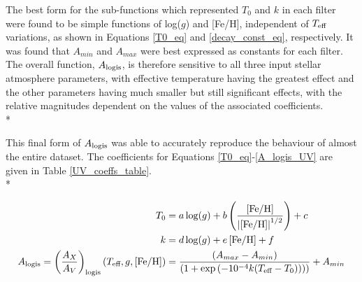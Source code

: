 \documentclass[12pt, a4paper]{report}
\begin{document}
The best form for the sub-functions which represented $T_{0}$ and $k$ in each filter were found to be simple functions of log($g$) and [Fe/H], independent of $T_{\textnormal{eff}}$ variations, as shown in Equations \ref{T0_eq} and \ref{decay_const_eq}, respectively. It was found that $A_{min}$ and $A_{max}$ were best expressed as constants for each filter. The overall function, $A_{\textnormal{logis}}$, is therefore sensitive to all three input stellar atmosphere parameters, with effective temperature having the greatest effect and the other parameters having much smaller but still significant effects, with the relative magnitudes dependent on the values of the associated coefficients.\\*

This final form of $A_{\textnormal{logis}}$ was able to accurately reproduce the behaviour of almost the entire dataset. The coefficients for Equations \ref{T0_eq}-\ref{A_logis_UV} are given in Table \ref{UV_coeffs_table}. \\*

\begin{align}
T_{\textnormal{0}} &= a\log(g) + b\left(\frac{\left[\textnormal{Fe/H}\right]}{\left|\left[\textnormal{Fe/H}\right]\right|^{1/2}}\right) + c \label{T0_eq}\\
k &= d\log(g) + e\left[\textnormal{Fe/H}\right] + f \label{decay_const_eq}\\
A_{\textnormal{logis}} = \left(\frac{A_{X}}{A_{V}}\right)_{\textnormal{logis}}(T_{\textnormal{eff}},g,\left[\textnormal{Fe/H}\right]) &= \frac{(A_{max}-A_{min})}{( 1 + \exp{(-10^{-4} k(T_{\textnormal{eff}}-T_{\textnormal{0}})) ) )}} + A_{min} \label{A_logis_UV}
\end{align}
\end{document}
